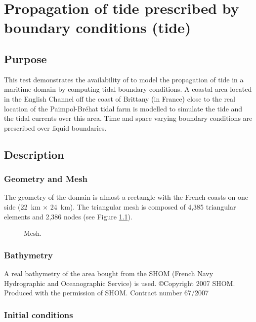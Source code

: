 \chapter{Propagation of tide prescribed by boundary conditions (tide)}

\section{Purpose}

This test demonstrates the availability of  to model the
propagation of tide in a maritime domain by computing tidal
boundary conditions.
A coastal area located in the English Channel off the coast of
Brittany (in France) close to the real location of the Paimpol-Bréhat
tidal farm is modelled to simulate the tide and the tidal currents
over this area.
Time and space varying boundary conditions are prescribed over
liquid boundaries.

\section{Description}

\subsection{Geometry and Mesh}

The geometry of the domain is almost a rectangle with the French coasts on
one side (22~km $\times$ 24~km).
The triangular mesh is composed of 4,385 triangular elements and 2,386 nodes
(see Figure \ref{fig:tide:mesh}).

\begin{figure}[H]
 \centering
 \caption{Mesh.}
 \label{fig:tide:mesh}
\end{figure}

\subsection{Bathymetry}

A real bathymetry of the area bought from the SHOM (French Navy
Hydrographic and Oceanographic Service) is used.
\copyright Copyright 2007 SHOM. Produced with the permission of SHOM.
Contract number 67/2007

\subsection{Initial conditions}

